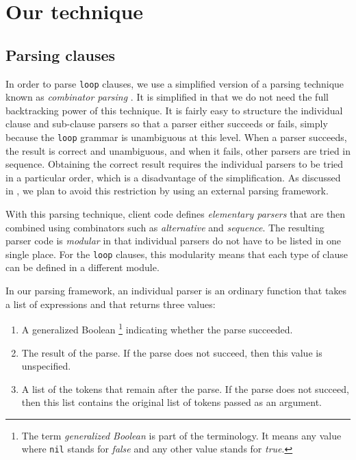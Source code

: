 \section{Our technique}
\label{sec-our-technique}

\subsection{Parsing clauses}
\label{sec-our-technique-parsing-clauses}

In order to parse \texttt{loop} clauses, we use a simplified version
of a parsing technique known as \emph{combinator parsing}
\cite{Wadler:1985:RFL:5280.5288}.  It is simplified in that we do not
need the full backtracking power of this technique.  It is fairly easy
to structure the individual clause and sub-clause parsers so that a
parser either succeeds or fails, simply because the \texttt{loop}
grammar is unambiguous at this level.  When a parser succeeds, the
result is correct and unambiguous, and when it fails, other parsers
are tried in sequence.  Obtaining the correct result requires the
individual parsers to be tried in a particular order, which is a
disadvantage of the simplification.  As discussed in
, we plan to avoid this
restriction by using an external parsing framework.

With this parsing technique, client code defines \emph{elementary
  parsers} that are then combined using combinators such as
\emph{alternative} and \emph{sequence}.  The resulting parser code is
\emph{modular} in that individual parsers do not have to be listed in
one single place.  For the \texttt{loop} clauses, this modularity
means that each type of clause can be defined in a different module.

In our parsing framework, an individual parser is an ordinary
\commonlisp{} function that takes a list of \commonlisp{} expressions
and that returns three values:

\begin{enumerate}
\item A generalized Boolean%
  \footnote{The term \emph{generalized Boolean} is part of the
    \commonlisp{} \cite{ansi:common:lisp} terminology.  It means any
    value where \texttt{nil} stands for \emph{false} and any other
    value stands for \emph{true}.}
  indicating whether the parse succeeded.
\item The result of the parse.  If the parse does not succeed, then
  this value is unspecified.
\item A list of the tokens that remain after the parse.  If the
  parse does not succeed, then this list contains the original
  list of tokens passed as an argument.
\end{enumerate}

